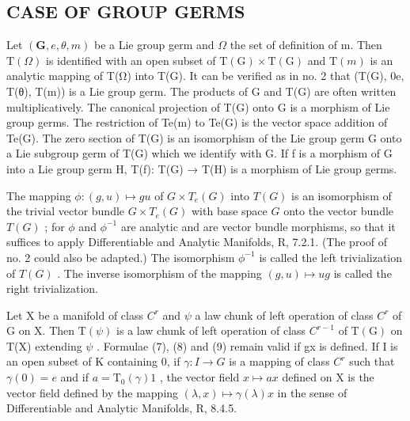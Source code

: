 \subsection{CASE OF GROUP GERMS}

Let \((\mathbf{G}, e, \theta, m)\) be a Lie group germ and \(\Omega\) the set of definition of m. Then \(\mathrm{T}(\Omega)\) is identified with an open subset of \(\mathrm{T}(\mathrm{G}) \times \mathrm{T}(\mathrm{G})\) and \(\mathrm{T}(m)\) is an analytic mapping of T(Ω) into T(G). It can be verified as in no. 2 that (T(G), 0e, T(θ), T(m)) is a Lie group germ. The products of G and T(G) are often written multiplicatively. The canonical projection of T(G) onto G is a morphism of Lie group germs. The restriction of Te(m) to Te(G) is the vector space addition of Te(G). The zero section of T(G) is an isomorphism of the Lie group germ G onto a Lie subgroup germ of T(G) which we identify with G. If f is a morphism of G into a Lie group germ H, T(f): T(G) → T(H) is a morphism of Lie group germs.

The mapping \(\phi\colon(g,u)\mapsto gu\) of \(G\times T_{e}(G)\) into \(T(G)\) is an isomorphism of the trivial vector bundle \(G\times T_{e}(G)\) with base space \(G\) onto the vector bundle \(T(G)\) ; for \(\phi\) and \(\phi^{-1}\) are analytic and are vector bundle morphisms, so that it suffices to apply Differentiable and Analytic Manifolds, R, 7.2.1. (The proof of no. 2 could also be adapted.) The isomorphism \(\phi^{-1}\) is called the left trivialization of \(T(G)\) . The inverse isomorphism of the mapping \((g,u)\mapsto ug\) is called the right trivialization.

Let X be a manifold of class \(C^{r}\) and \(\psi\) a law chunk of left operation of class \(C^{r}\) of G on X. Then \(\mathrm{T}(\psi)\) is a law chunk of left operation of class \(C^{r-1}\) of \(\mathrm{T}(\mathrm{G})\) on T(X) extending \(\psi\) . Formulae (7), (8) and (9) remain valid if gx is defined. If I is an open subset of K containing 0, if \(\gamma: I \to G\) is a mapping of class \(C^{r}\) such that \(\gamma(0) = e\) and if \(a = \mathrm{T}_{0}(\gamma)1\) , the vector field \(x \mapsto ax\) defined on X is the vector field defined by the mapping \((\lambda, x) \mapsto \gamma(\lambda)x\) in the sense of Differentiable and Analytic Manifolds, R, 8.4.5.

